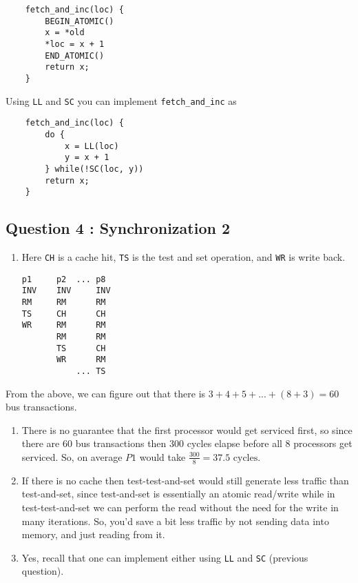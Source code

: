 \begin{verbatim}
    fetch_and_inc(loc) {
        BEGIN_ATOMIC()
        x = *old
        *loc = x + 1
        END_ATOMIC()
        return x;
    }
\end{verbatim}

Using \texttt{LL} and \texttt{SC} you can implement
\texttt{fetch\_and\_inc} as

\begin{verbatim}
    fetch_and_inc(loc) {
        do {
            x = LL(loc)
            y = x + 1
        } while(!SC(loc, y))
        return x;
    }
\end{verbatim}

\subsection{Question 4 : Synchronization
2}\label{question-4-synchronization-2}

\begin{enumerate}
\def\labelenumi{\alph{enumi}.}
\item
  Here \texttt{CH} is a cache hit, \texttt{TS} is the test and set
  operation, and \texttt{WR} is write back.

\begin{verbatim}
p1     p2  ... p8
INV    INV     INV
RM     RM      RM
TS     CH      CH
WR     RM      RM
       RM      RM
       TS      CH
       WR      RM
           ... TS
\end{verbatim}
\end{enumerate}

From the above, we can figure out that there is
$3 + 4 + 5 + ... + (8 + 3) = 60$ bus transactions.

\begin{enumerate}
\def\labelenumi{\alph{enumi}.}
\setcounter{enumi}{1}
\item
  There is no guarantee that the first processor would get serviced
  first, so since there are $60$ bus transactions then $300$ cycles
  elapse before all $8$ processors get serviced. So, on average $P1$
  would take $\frac{300}{8} = 37.5 \text{ cycles}$.
\item
  If there is no cache then test-test-and-set would still generate less
  traffic than test-and-set, since test-and-set is essentially an atomic
  read/write while in test-test-and-set we can perform the read without
  the need for the write in many iterations. So, you'd save a bit less
  traffic by not sending data into memory, and just reading from it.
\item
  Yes, recall that one can implement either using \texttt{LL} and
  \texttt{SC} (previous question).
\end{enumerate}

